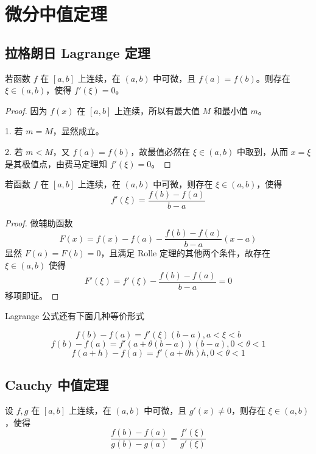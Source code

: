 \chapter{微分中值定理}

\section{拉格朗日 Lagrange 定理}

\begin{theorem}
    若函数 $f$ 在 $[a,b]$ 上连续，在 $(a,b)$ 中可微，且 $f(a)=f(b)$。则存在 $\xi\in(a,b)$，使得 $f'(\xi)=0$。
\end{theorem}

\begin{proof}
    因为 $f(x)$ 在 $[a,b]$ 上连续，所以有最大值 $M$ 和最小值 $m$。

    1. 若 $m=M$，显然成立。

    2. 若 $m < M$，又 $f(a) = f(b)$，故最值必然在 $\xi \in (a, b)$ 中取到，从而 $x=\xi$ 是其极值点，由费马定理知 $f'(\xi) = 0$。
\end{proof}

\begin{theorem}
    若函数 $f$ 在 $[a,b]$ 上连续，在 $(a,b)$ 中可微，则存在 $\xi\in(a,b)$，使得
    $$f'(\xi)=\frac{f(b)-f(a)}{b-a}$$
\end{theorem}



\begin{proof}
    做辅助函数
    \[ F(x) = f(x) - f(a) - \frac{f(b) - f(a)}{b - a}(x - a) \]
    显然 $F(a) = F(b) = 0$，且满足 Rolle 定理的其他两个条件，故存在 $\xi \in (a, b)$ 使得
    \[ F'(\xi) = f'(\xi) - \frac{f(b) - f(a)}{b - a} = 0 \]
    移项即证。
\end{proof}

Lagrange 公式还有下面几种等价形式

$$f(b)-f(a) = f'(\xi)(b-a),a<\xi<b$$
$$f(b)-f(a) = f'(a+\theta(b-a))(b-a),0<\theta<1$$
$$f(a+h) - f(a) = f'(a+\theta h)h,0<\theta<1$$

\section{Cauchy 中值定理}

\begin{theorem}
    设 $f,g$ 在 $[a,b]$ 上连续，在 $(a,b)$ 中可微，且 $g'(x)\ne 0$，则存在 $\xi\in (a,b)$，使得
    $$\frac{f(b)-f(a)}{g(b)-g(a)} = \frac{f'(\xi)}{g'(\xi)}$$
\end{theorem}

